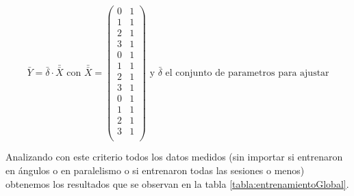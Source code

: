 \documentclass{article}
\begin{document}
\begin{equation} \label{ec:MatrixExpandida}
    \bar {Y} = \bar{\delta} \cdot \bar{\bar{X}} \text{ con } \bar{\bar{X}} =
     \begin{pmatrix}
        0 & 1\\
        1 & 1\\
        2 & 1\\
        3 & 1\\
        0 & 1\\
        1 & 1\\
        2 & 1\\
        3 & 1\\
        0 & 1\\
        1 & 1\\
        2 & 1\\
        3 & 1\\
     \end{pmatrix} \text{ y $\bar{\delta}$ el conjunto de parametros para ajustar}
 \end{equation}

Analizando con este criterio todos los datos medidos (sin importar si entrenaron en ángulos o en paralelismo o si entrenaron todas las sesiones o menos) obtenemos los resultados que se observan en la tabla \ref{tabla:entrenamientoGlobal}.
\end{document}
